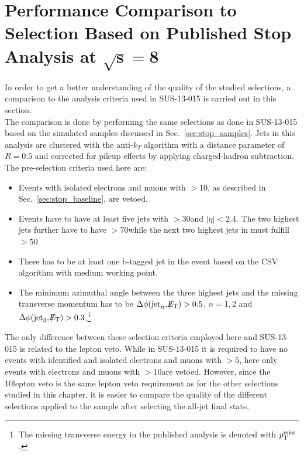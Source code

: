 \section[Performance Comparison to Selection Based on Published Stop Analysis]{Performance Comparison to Selection Based on Published Stop Analysis at $\mathbf{\sqrt{s} = 8}$\tev}
\label{sec:stop_pub}
In order to get a better understanding of the quality of the studied selections, a comparison to the analysis criteria used in SUS-13-015 is carried out in this section. \\
The comparison is done by performing the same selections as done in SUS-13-015 based on the simulated samples discussed in Sec.~\ref{sec:stop_samples}. Jets in this analysis are clustered with the anti-$k_T$ algorithm with a distance parameter of $R = 0.5$ and corrected for pileup effects by applying charged-hadron subtraction. The pre-selection criteria used here are:
\begin{itemize}
 \item Events with isolated electrons and muons with \pt$ > 10$\gev, as described in Sec.~\ref{sec:stop_baseline}, are vetoed.
 \item Events have to have at least five jets with \pt$ > 30$\gev and $|\eta| < 2.4$. The two highest \pt jets further have to have \pt$> 70$\gev while the next two highest jets in \pt must fulfill \pt$ > 50$\gev.
 \item There has to be at least one b-tagged jet in the event based on the CSV algorithm with medium working point. 
 \item The minimum azimuthal angle between the three highest jets and the missing transverse momentum has to be $\Delta \phi(\mathrm{jet}_n, \slash\mkern-12mu{E}_{\text{T}}) > 0.5$, $n = 1,2$ and $\Delta \phi(\mathrm{jet}_3, \slash\mkern-12mu{E}_{\text{T}}) > 0.3$.\footnote{The missing transverse energy in the published analysis is denoted with $p_{\text{T}}^\mathrm{miss}$.}%
\end{itemize}
The only difference between these selection criteria employed here and SUS-13-015 is related to the lepton veto. While in SUS-13-015 it is required to have no events with identified and isolated electrons and muons with \pt$> 5$\gev, here only events with electrons and muons with \pt$> 10$\gev are vetoed. However, since the 10\gev lepton veto is the same lepton veto requirement as for the other selections studied in this chapter, it is easier to compare the quality of the different selections applied to the sample after selecting the all-jet final state. \\
